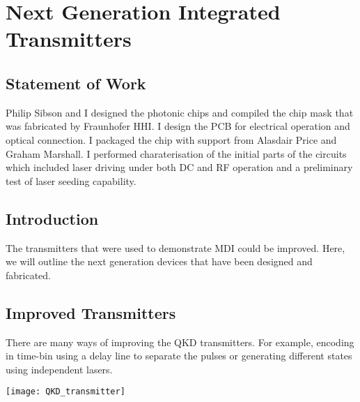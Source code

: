 %
%
\graphicspath{{./chapters/chapter06/fig06/}}

\let\textcircled=\pgftextcircled
\chapter{Next Generation Integrated Transmitters}
\label{chap:future}
\glsresetall

\section*{Statement of Work}

Philip Sibson and I designed the photonic chips and compiled the chip mask that was fabricated by Fraunhofer HHI. I design the PCB for electrical operation and optical connection. I packaged the chip with support from Alasdair Price and Graham Marshall. I performed charaterisation of the initial parts of the circuits which included laser driving under both DC and RF operation and a preliminary test of laser seeding capability.

\section{Introduction}

The transmitters that were used to demonstrate \ac{MDI} could be improved. Here, we will outline the next generation devices that have been designed and fabricated. 

\section{Improved Transmitters}

There are many ways of improving the \ac{QKD} transmitters. For example, encoding in time-bin using a delay line to separate the pulses or generating different states using independent lasers.

\begin{sidewaysfigure}
	\centering
	\texttt{[image: QKD\_transmitter]}
	\caption[Latest generation InP QKD Transmitter]{Latest generation HHI indium phosphide transmitter. The \SI[product-units=power]{6x4}{mm} chip contains a few ways to create BB84 states for QKD. Firstly, we have designs to compare \ac{dfb} and \ac{DBR} lasers. Secondly, we can use a delay line to separate the time bins. Finally, we have multiplexed lasers to pulse independently lasers for each state.}
\end{sidewaysfigure}

